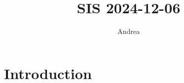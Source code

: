\documentclass{article}
\author{Andrea}
\title{SIS 2024-12-06}
\begin{document}
\maketitle
\tableofcontents

\section{Introduction}
\end{document}
